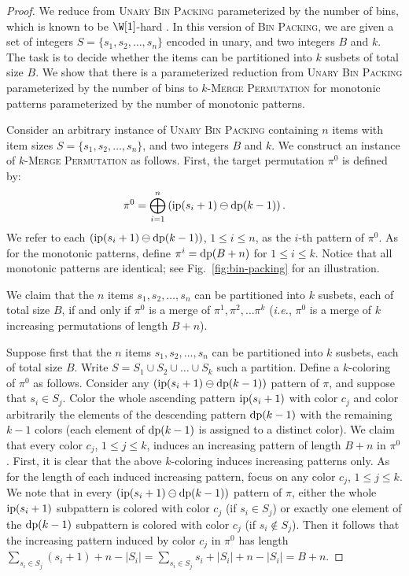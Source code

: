 \begin{proof}
  We reduce from \textsc{Unary Bin Packing} parameterized by the number of bins, which is
  known to be $\W[1]$-hard \cite{DBLP:journals/jcss/JansenKMS13}.
  In this version of \textsc{Bin Packing}, we are given a set of integers
  $S = \{s_1, s_2, \dots, s_n\}$ encoded in unary, and two integers $B$ and $k$.
  The task is to decide whether the items can be partitioned into $k$ susbets of
  total size $B$.
  We show that there is a parameterized reduction from
  \textsc{Unary Bin Packing} parameterized by the number of bins to
  \textsc{$k$-Merge Permutation} for monotonic patterns
  parameterized by the number of monotonic patterns.

  Consider an arbitrary instance of \textsc{Unary Bin Packing} containing
  $n$ items with item sizes $S = \{s_1, s_2, \dots, s_n\}$,
  and two integers $B$ and $k$.
  We construct an instance of \textsc{$k$-Merge Permutation}
  as follows.
  First, the target permutation $\pi^0$ is defined by:
  $$
  \pi^0 =
    \bigoplus_{i=1}^{n} \left(\operatorname{ip}(s_i+1) \ominus \operatorname{dp}(k-1)\right)\text{.}
  $$
  We refer to each
  $\left(\operatorname{ip}(s_i+1) \ominus \operatorname{dp}(k-1)\right)$, $1 \leq i \leq n$,
  as the $i$-th pattern of $\pi^0$.
  As for the monotonic patterns, define $\pi^i = \operatorname{dp}(B+n)$
  for $1 \leq i \leq k$.
  Notice that all monotonic patterns are identical;
  see Fig.~\ref{fig:bin-packing} for an illustration.

  

  We claim that the $n$ items $s_1, s_2, \dots, s_n$
  can be partitioned into $k$ susbets, each of total size $B$,
  if and only if
  $\pi^0$ is a merge of $\pi^1, \pi^2, \dots \pi^k$
  (\emph{i.e.}, $\pi^0$ is a merge of $k$ increasing permutations of length $B+n$).

  Suppose first that the $n$ items $s_1, s_2, \dots, s_n$
  can be partitioned into $k$ susbets, each of total size $B$.
  Write $S = S_1 \cup S_2 \cup \dots \cup S_k$ such a partition.
  Define a $k$-coloring of $\pi^0$ as follows.
  Consider any
  $\left(\operatorname{ip}(s_i+1) \ominus \operatorname{dp}(k-1)\right)$ pattern of $\pi$,
  and suppose that $s_i \in S_j$.
  Color the whole ascending pattern $\operatorname{ip}(s_i+1)$ with color $c_j$
  and color arbitrarily the elements of the descending pattern
  $\operatorname{dp}(k-1)$ with the remaining $k-1$ colors
  (each element of $\operatorname{dp}(k-1)$ is assigned to a distinct color).
  We claim that every color $c_j$, $1 \leq j \leq k$, induces an increasing pattern
  of length $B+n$ in $\pi^0$.
  First, it is clear that the above $k$-coloring induces increasing patterns only.
  As for the length of each induced increasing pattern, focus on any color
  $c_j$, $1 \leq j \leq k$.
  We note that in every
  $\left(\operatorname{ip}(s_i+1) \ominus \operatorname{dp}(k-1)\right)$
  pattern of $\pi$, either the whole $\operatorname{ip}(s_i+1)$ subpattern is
  colored with color $c_j$ (if $s_i \in S_j$) or exactly one element of the
  $\operatorname{dp}(k-1)$ subpattern is colored with color $c_j$
  (if $s_i \notin S_j$).
  Then it follows that the increasing pattern induced by color $c_j$ in $\pi^0$ has
  length
  $\sum_{s_i \in S_j} \left(s_i + 1\right) + n - |S_i|
  =
  \sum_{s_i \in S_j} s_i + |S_i| + n - |S_i|
  = B + n$.


\end{proof}
